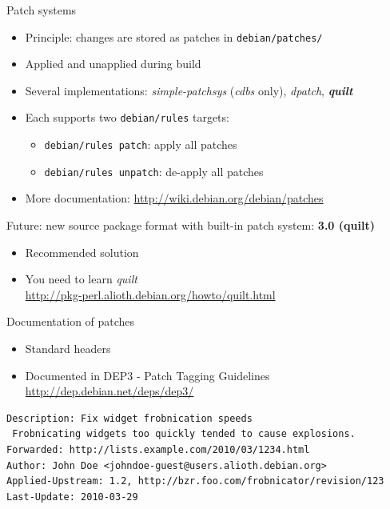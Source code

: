 \documentclass[10pt,final]{beamer}
\begin{document}
\begin{frame}{Patch systems}
\begin{itemize}
\item Principle: changes are stored as patches in \texttt{debian/patches/}
		\hbr
\item Applied and unapplied during build
		\hbr
\item Several implementations: \textsl{simple-patchsys} (\textsl{cdbs} only), \textsl{dpatch}, \textbf{\textsl{quilt}}
	\hbr
\item Each supports two \texttt{debian/rules} targets:
	\begin{itemize}
		\item \texttt{debian/rules patch}: apply all patches
		\item \texttt{debian/rules unpatch}: de-apply all patches
	\end{itemize}
	\hbr
\item More documentation: \url{http://wiki.debian.org/debian/patches}
\end{itemize}
\br
Future: new source package format with built-in patch system: \textbf{3.0 (quilt)}
\begin{itemize}
	\item Recommended solution
	\item You need to learn \textsl{quilt}\\
		\url{http://pkg-perl.alioth.debian.org/howto/quilt.html}

\end{itemize}
\end{frame}

\begin{frame}[fragile]{Documentation of patches}
\begin{itemize}
	\item Standard headers
		\hbr
	\item Documented in DEP3 - Patch Tagging Guidelines\\
		\url{http://dep.debian.net/deps/dep3/}
\end{itemize}
\begin{lstlisting}[basicstyle=\ttfamily\footnotesize]
Description: Fix widget frobnication speeds
 Frobnicating widgets too quickly tended to cause explosions.
Forwarded: http://lists.example.com/2010/03/1234.html
Author: John Doe <johndoe-guest@users.alioth.debian.org>
Applied-Upstream: 1.2, http://bzr.foo.com/frobnicator/revision/123
Last-Update: 2010-03-29
\end{lstlisting}
\end{frame}
\end{document}
